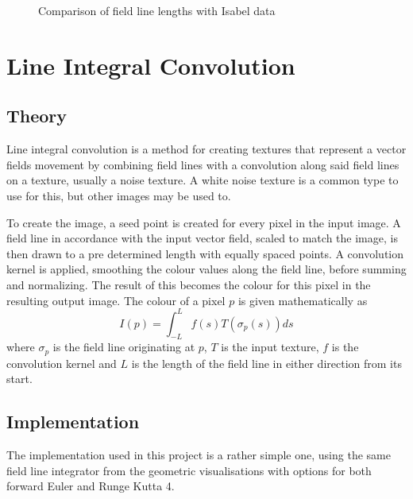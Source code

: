 \documentclass{article}
\begin{document}
\begin{figure}
\caption{Comparison of field line lengths with Isabel data}
\end{figure}

\section{Line Integral Convolution}
\subsection{Theory}
Line integral convolution is a method for creating textures that represent a vector
fields movement by combining field lines with a convolution along said field lines
on a texture, usually a noise texture. A white noise texture is a common type to
use for this, but other images may be used to.

To create the image, a seed point is created for every pixel in the input image.
A field line in accordance with the input vector field, scaled to match the image,
is then drawn to a pre determined length with equally spaced points. A convolution
kernel is applied, smoothing the colour values along the field line, before summing
and normalizing. The result of this becomes the colour for this pixel in the resulting
output image. The colour of a pixel $p$ is given mathematically as
$$ I(p) = \int_{-L}^{L} f(s) T(\sigma_p(s)) ds$$
where $\sigma_p$ is the field line originating at $p$, $T$ is the input texture,
$f$ is the convolution kernel and $L$ is the length of the field line in either
direction from its start.

\subsection{Implementation}
The implementation used in this project is a rather simple one, using the same
field line integrator from the geometric visualisations with options for both
forward Euler and Runge Kutta 4.
\end{document}
